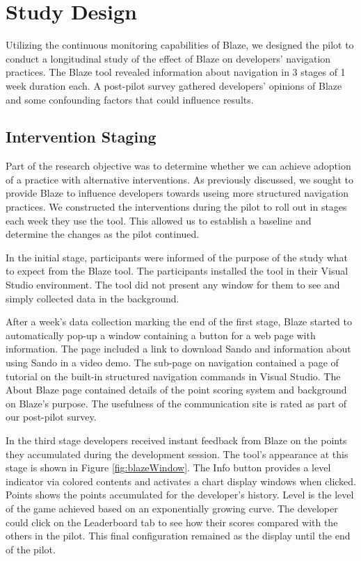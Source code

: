 \documentclass{sig-alternate}
\begin{document}
\section {Study Design}

Utilizing the continuous monitoring capabilities of Blaze, we designed the pilot to conduct a longitudinal study of the effect of Blaze on developers' navigation practices.  The Blaze tool revealed information about navigation in 3 stages of 1 week duration each.  A post-pilot survey gathered developers' opinions of Blaze and some confounding factors that could influence results.

\subsection{Intervention Staging}

Part of the research objective was to determine whether we can achieve adoption of a practice with alternative interventions.  As previously discussed, we sought to provide Blaze to influence developers towards useing more structured navigation practices.  We constructed the interventions during the pilot to roll out in stages each week they use the tool.  This allowed us to establish a baseline and determine the changes as the pilot continued.

In the initial stage, participants were informed of the purpose of the study what to expect from the Blaze tool.  The participants installed the tool in their Visual Studio environment.  The tool did not present any window for them to see and simply collected data in the background.   

After a week's data collection marking the end of the first stage, Blaze started to automatically pop-up a window containing a button for a web page with information.  The page included a link to download Sando  and information about using Sando in a video demo.  The sub-page on navigation contained a page of tutorial on the built-in structured navigation commands in Visual Studio.  The About Blaze page contained details of the point scoring system and background on Blaze's purpose.  The usefulness of the communication site is rated as part of our post-pilot  survey.

In the third stage developers received instant feedback from Blaze on the points they accumulated during the development session.  The tool's appearance at this stage is shown in Figure \ref{fig:blazeWindow}.  The Info button provides a level indicator via colored contents and activates a chart display windows when clicked.  Points shows the points accumulated for the developer's history.  Level is the level of the game achieved based on an exponentially growing curve.   The developer could click on the Leaderboard tab to see how their scores compared with the others in the pilot.  This final configuration remained as the display until the end of the pilot.  
\end{document}
